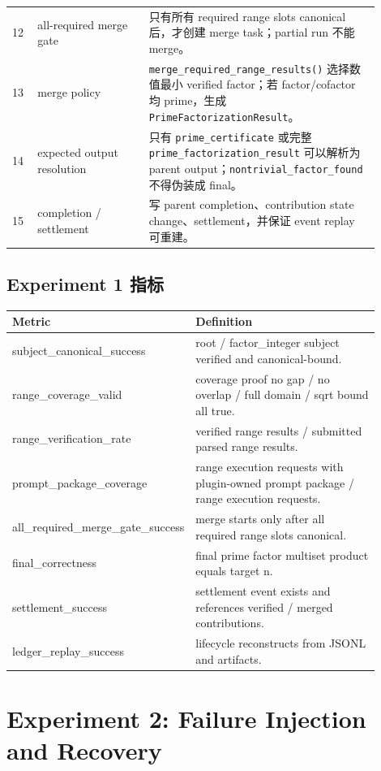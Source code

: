 \documentclass[11pt]{ctexart}
\begin{document}
\begin{longtable}{p{0.06\linewidth}p{0.27\linewidth}p{0.57\linewidth}}
12 & all-required merge gate & 只有所有 required range slots canonical 后，才创建 merge task；partial run 不能 merge。 \\
13 & merge policy & \texttt{merge\_required\_range\_results()} 选择数值最小 verified factor；若 factor/cofactor 均 prime，生成 \texttt{PrimeFactorizationResult}。 \\
14 & expected output resolution & 只有 \texttt{prime\_certificate} 或完整 \texttt{prime\_factorization\_result} 可以解析为 parent output；\texttt{nontrivial\_factor\_found} 不得伪装成 final。 \\
15 & completion / settlement & 写 parent completion、contribution state change、settlement，并保证 event replay 可重建。 \\
\bottomrule
\end{longtable}

\subsection{Experiment 1 指标}

\begin{longtable}{p{0.35\linewidth}p{0.55\linewidth}}
\toprule
Metric & Definition \\
\midrule
subject\_canonical\_success & root / factor\_integer subject verified and canonical-bound. \\
range\_coverage\_valid & coverage proof no gap / no overlap / full domain / sqrt bound all true. \\
range\_verification\_rate & verified range results / submitted parsed range results. \\
prompt\_package\_coverage & range execution requests with plugin-owned prompt package / range execution requests. \\
all\_required\_merge\_gate\_success & merge starts only after all required range slots canonical. \\
final\_correctness & final prime factor multiset product equals target n. \\
settlement\_success & settlement event exists and references verified / merged contributions. \\
ledger\_replay\_success & lifecycle reconstructs from JSONL and artifacts. \\
\bottomrule
\end{longtable}

\section{Experiment 2: Failure Injection and Recovery}
\end{document}
